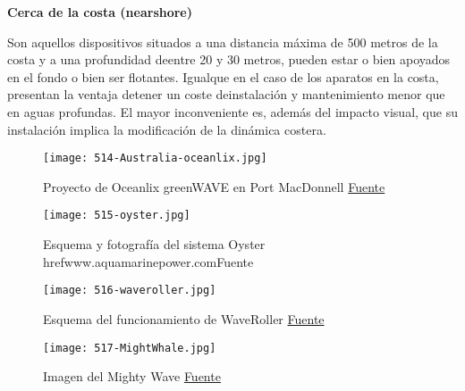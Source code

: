 \textbf{Cerca de la costa (nearshore)}

Son aquellos dispositivos situados a una distancia máxima de 500 metros
de la costa y a una profundidad deentre 20 y 30 metros, pueden estar o
bien apoyados en el fondo o bien ser flotantes. Igualque en el caso de
los aparatos en la costa, presentan la ventaja detener un coste
deinstalación y mantenimiento menor que en aguas profundas. El mayor
inconveniente es, además del impacto visual, que su instalación implica
la modificación de la dinámica costera.

\begin{figure}
\centering
\texttt{[image: 514-Australia-oceanlix.jpg]}
\caption[Proyecto de Oceanlix greenWAVE en Port MacDonnell]{Proyecto de Oceanlix greenWAVE en Port MacDonnell \href{https://www.offshorewind.biz/2013/09/04/australia-construction-starts-on-oceanlinxs-wave-energy-project/}{Fuente}}
\label{fig:Australia-oceanlix}
\end{figure}

\begin{figure}
\centering
\texttt{[image: 515-oyster.jpg]}
\caption[Esquema y fotografía del sistema Oyster]{Esquema y fotografía del sistema Oyster href{www.aquamarinepower.com}{Fuente}}
\label{fig:oyster}
\end{figure}

\begin{figure}
\centering
\texttt{[image: 516-waveroller.jpg]}
\caption[Esquema del funcionamiento de WaveRoller]{Esquema del funcionamiento de WaveRoller \href{http://www.see.murdoch.edu.au/resources/info/Tech/wave/}{Fuente}}
\label{fig:waveroller}
\end{figure}

\begin{figure}
\centering
\texttt{[image: 517-MightWhale.jpg]}
\caption[Imagen del Mighty Wave]{Imagen del Mighty Wave \href{http://www.jamstec.go.jp/}{Fuente}}
\label{fig:MightWhale}
\end{figure}

